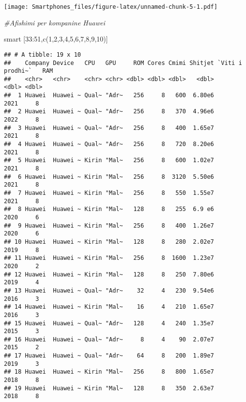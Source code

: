 \documentclass[
]{article}
\newenvironment{Shaded}{\begin{snugshade}}{\end{snugshade}}
\newcommand{\CommentTok}[1]{\textcolor[rgb]{0.56,0.35,0.01}{\textit{#1}}}
\newcommand{\DecValTok}[1]{\textcolor[rgb]{0.00,0.00,0.81}{#1}}
\newcommand{\FunctionTok}[1]{\textcolor[rgb]{0.00,0.00,0.00}{#1}}
\newcommand{\NormalTok}[1]{#1}
\newcommand{\SpecialCharTok}[1]{\textcolor[rgb]{0.00,0.00,0.00}{#1}}
\begin{document}
\texttt{[image: Smartphones\_files/figure-latex/unnamed-chunk-5-1.pdf]}

\begin{Shaded}
\begin{Highlighting}[]
\CommentTok{\#Afishimi per kompanine Huawei}

\NormalTok{smart [}\DecValTok{33}\SpecialCharTok{:}\DecValTok{51}\NormalTok{,}\FunctionTok{c}\NormalTok{(}\DecValTok{1}\NormalTok{,}\DecValTok{2}\NormalTok{,}\DecValTok{3}\NormalTok{,}\DecValTok{4}\NormalTok{,}\DecValTok{5}\NormalTok{,}\DecValTok{6}\NormalTok{,}\DecValTok{7}\NormalTok{,}\DecValTok{8}\NormalTok{,}\DecValTok{9}\NormalTok{,}\DecValTok{10}\NormalTok{)]}
\end{Highlighting}
\end{Shaded}

\begin{verbatim}
## # A tibble: 19 x 10
##    Company Device   CPU   GPU     ROM Cores Cmimi Shitjet `Viti i prodhi~`   RAM
##    <chr>   <chr>    <chr> <chr> <dbl> <dbl> <dbl>   <dbl>            <dbl> <dbl>
##  1 Huawei  Huawei ~ Qual~ "Adr~   256     8   600  6.80e6             2021     8
##  2 Huawei  Huawei ~ Qual~ "Adr~   256     8   370  4.96e6             2022     8
##  3 Huawei  Huawei ~ Qual~ "Adr~   256     8   400  1.65e7             2021     8
##  4 Huawei  Huawei ~ Qual~ "Adr~   256     8   720  8.20e6             2021     8
##  5 Huawei  Huawei ~ Kirin "Mal~   256     8   600  1.02e7             2021     8
##  6 Huawei  Huawei ~ Kirin "Mal~   256     8  3120  5.50e6             2021     8
##  7 Huawei  Huawei ~ Kirin "Mal~   256     8   550  1.55e7             2021     8
##  8 Huawei  Huawei ~ Kirin "Mal~   128     8   255  6.9 e6             2020     6
##  9 Huawei  Huawei ~ Kirin "Mal~   256     8   400  1.26e7             2020     6
## 10 Huawei  Huawei ~ Kirin "Mal~   128     8   280  2.02e7             2019     8
## 11 Huawei  Huawei ~ Kirin "Mal~   256     8  1600  1.23e7             2020     2
## 12 Huawei  Huawei ~ Kirin "Mal~   128     8   250  7.80e6             2019     4
## 13 Huawei  Huawei ~ Qual~ "Adr~    32     4   230  9.54e6             2016     3
## 14 Huawei  Huawei ~ Kirin "Mal~    16     4   210  1.65e7             2016     3
## 15 Huawei  Huawei ~ Qual~ "Adr~   128     4   240  1.35e7             2015     3
## 16 Huawei  Huawei ~ Qual~ "Adr~     8     4    90  2.07e7             2015     2
## 17 Huawei  Huawei ~ Qual~ "Adr~    64     8   200  1.89e7             2019     3
## 18 Huawei  Huawei ~ Kirin "Mal~   256     8   800  1.65e7             2018     8
## 19 Huawei  Huawei ~ Kirin "Mal~   128     8   350  2.63e7             2018     8
\end{verbatim}
\end{document}
